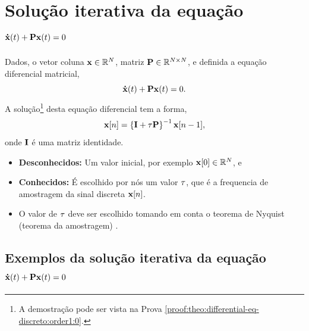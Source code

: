 \section{ Solução iterativa da equação $\DTVECTOR{x}(t) + \MATRIX{P} \VECTOR{x}(t)=0$ }

\begin{theorem}[Equação 
$\DTVECTOR{x}(t) + \MATRIX{P} \VECTOR{x}(t)=0$ com diferenças regressivas:]
\label{theo:differential-eq-discreto:order1:0}
Dados, o vetor coluna $\VECTOR{x} \in \mathbb{R}^N$, matriz $\MATRIX{P} \in \mathbb{R}^{N\times N}$, 
e definida a equação diferencial matricial,
\begin{equation}\label{eq:theo:firstorder:1}
\DTVECTOR{x}(t) + \MATRIX{P} \VECTOR{x}(t)=0.
\end{equation}
A solução\footnote{A
demostração pode ser vista na Prova \ref{proof:theo:differential-eq-discreto:order1:0}.} desta equação diferencial tem  a forma,
\begin{equation}\label{eq:theo:firstorder:2}
  \VECTOR{x}[n]=\left\{\MATRIX{I} + \ToS \MATRIX{P}\right\}^{-1}\VECTOR{x}[n-1],
\end{equation}
onde $\MATRIX{I}$ é uma matriz identidade.
\begin{itemize}
\item \textbf{Desconhecidos:} Um valor inicial, por exemplo $\VECTOR{x}[0] \in \mathbb{R}^{N}$, e
\item  \textbf{Conhecidos:} É escolhido por nós um valor $\tau$, 
que é a frequencia de amostragem da sinal discreta $\VECTOR{x}[n]$.
\end{itemize}
\end{theorem}

\begin{tcbattention}
\begin{itemize}
\item O valor de $\tau$ deve ser escolhido tomando em conta o teorema de Nyquist (teorema da amostragem) 
\cite[pp. 67]{rochol2009comunicacao} \cite[pp. 122]{forouzan2009comunicacao}.
\end{itemize}
\end{tcbattention}

\subsection{Exemplos da solução iterativa da equação $\DTVECTOR{x}(t) + \MATRIX{P} \VECTOR{x}(t)=0$}

